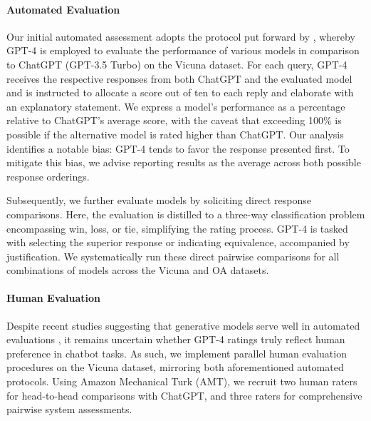 \paragraph{Automated Evaluation} Our initial automated assessment adopts the protocol put forward by \citet{vicuna2023}, whereby GPT-4 is employed to evaluate the performance of various models in comparison to ChatGPT (GPT-3.5 Turbo) on the Vicuna dataset. For each query, GPT-4 receives the respective responses from both ChatGPT and the evaluated model and is instructed to allocate a score out of ten to each reply and elaborate with an explanatory statement. We express a model’s performance as a percentage relative to ChatGPT’s average score, with the caveat that exceeding 100\% is possible if the alternative model is rated higher than ChatGPT. Our analysis identifies a notable bias: GPT-4 tends to favor the response presented first. To mitigate this bias, we advise reporting results as the average across both possible response orderings.

Subsequently, we further evaluate models by soliciting direct response comparisons. Here, the evaluation is distilled to a three-way classification problem encompassing win, loss, or tie, simplifying the rating process. GPT-4 is tasked with selecting the superior response or indicating equivalence, accompanied by justification. We systematically run these direct pairwise comparisons for all combinations of models across the Vicuna and OA datasets.

\paragraph{Human Evaluation} Despite recent studies suggesting that generative models serve well in automated evaluations \citep{fu2023gptscore}, it remains uncertain whether GPT-4 ratings truly reflect human preference in chatbot tasks. As such, we implement parallel human evaluation procedures on the Vicuna dataset, mirroring both aforementioned automated protocols. Using Amazon Mechanical Turk (AMT), we recruit two human raters for head-to-head comparisons with ChatGPT, and three raters for comprehensive pairwise system assessments.

